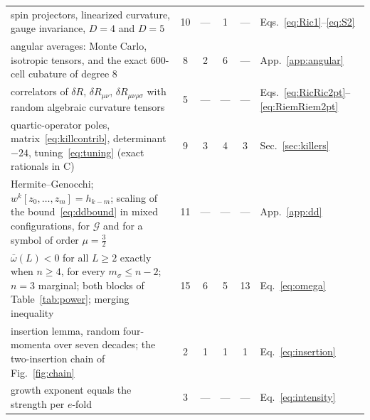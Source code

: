 \documentclass[aps,prd,10pt,twocolumn,superscriptaddress,nofootinbib,floatfix,longbibliography]{revtex4-2}
\begin{document}
\begin{table}[t]
\begin{ruledtabular}
\begin{tabular}{p{10.6cm}ccccl}
spin projectors, linearized curvature, gauge invariance, $D=4$ and $D=5$ & 10 & --- & 1 & --- & Eqs.~\eqref{eq:Ric1}--\eqref{eq:S2}\\
angular averages: Monte Carlo, isotropic tensors, and the exact 600-cell cubature of degree $8$ & 8 & 2 & 6 & --- & App.~\ref{app:angular}\\
correlators of $\delta R$, $\delta R_{\mu\nu}$, $\delta R_{\mu\nu\rho\sigma}$ with random algebraic curvature tensors & 5 & --- & --- & --- & Eqs.~\eqref{eq:RicRic2pt}--\eqref{eq:RiemRiem2pt}\\
quartic-operator poles, matrix~\eqref{eq:killcontrib}, determinant $-24$, tuning~\eqref{eq:tuning} (exact rationals in C) & 9 & 3 & 4 & 3 & Sec.~\ref{sec:killers}\\
Hermite--Genocchi; $w^k[z_0,\dots,z_m]=h_{k-m}$; scaling of the bound~\eqref{eq:ddbound} in mixed configurations, for $\mathcal G$ and for a symbol of order $\mu=\frac32$ & 11 & --- & --- & --- & App.~\ref{app:dd}\\
$\bar\omega(L)<0$ for all $L\ge2$ exactly when $n\ge4$, for every $m_\sigma\le n-2$; $n=3$ marginal; both blocks of Table~\ref{tab:power}; merging inequality & 15 & 6 & 5 & 13 & Eq.~\eqref{eq:omega}\\
insertion lemma, random four-momenta over seven decades; the two-insertion chain of Fig.~\ref{fig:chain} & 2 & 1 & 1 & 1 & Eq.~\eqref{eq:insertion}\\
growth exponent equals the strength per $e$-fold & 3 & --- & --- & --- & Eq.~\eqref{eq:intensity}\\
\end{tabular}
\end{ruledtabular}
\end{table}
\end{document}
